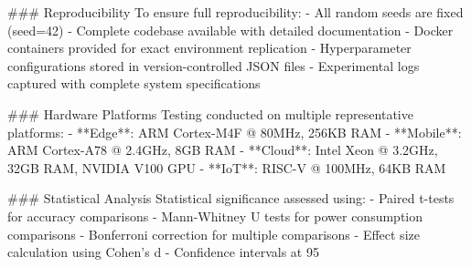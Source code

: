 ### Reproducibility
To ensure full reproducibility:
- All random seeds are fixed (seed=42)
- Complete codebase available with detailed documentation
- Docker containers provided for exact environment replication
- Hyperparameter configurations stored in version-controlled JSON files
- Experimental logs captured with complete system specifications

### Hardware Platforms
Testing conducted on multiple representative platforms:
- **Edge**: ARM Cortex-M4F @ 80MHz, 256KB RAM
- **Mobile**: ARM Cortex-A78 @ 2.4GHz, 8GB RAM  
- **Cloud**: Intel Xeon @ 3.2GHz, 32GB RAM, NVIDIA V100 GPU
- **IoT**: RISC-V @ 100MHz, 64KB RAM

### Statistical Analysis
Statistical significance assessed using:
- Paired t-tests for accuracy comparisons
- Mann-Whitney U tests for power consumption comparisons  
- Bonferroni correction for multiple comparisons
- Effect size calculation using Cohen's d
- Confidence intervals at 95%